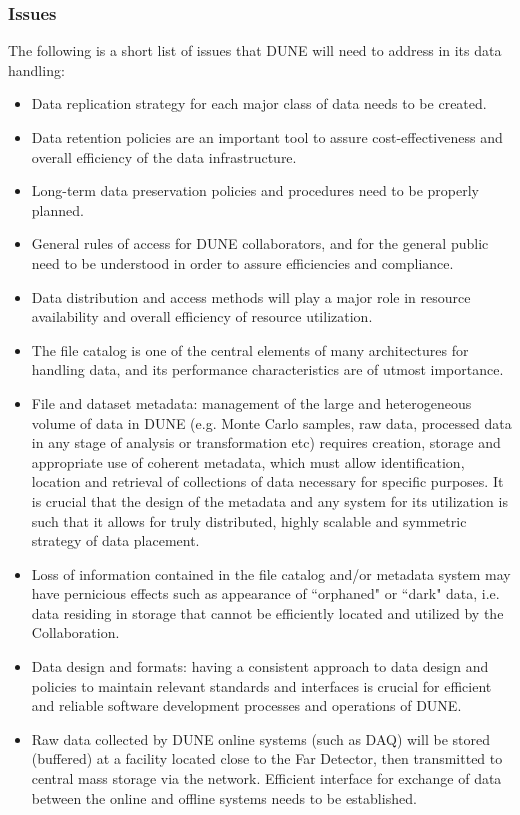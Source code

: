 \subsubsection{Issues}
The following is a short list of issues that DUNE will need to address in its data handling:
\begin{itemize}
\item Data replication strategy for each major class of data needs to be created.

\item Data retention policies are an important tool to assure cost-effectiveness and overall efficiency of the  data infrastructure.

\item Long-term data preservation policies and procedures need to be properly planned.

\item General rules of access for DUNE collaborators, and for the general public need to be understood in order to assure efficiencies and compliance.

\item Data distribution and access methods will play a major role in resource availability and overall efficiency of resource utilization.

\item The file catalog is one of the central elements of many architectures for handling data, and its performance characteristics are of utmost importance.

\item File and dataset metadata: management of the large and heterogeneous volume of data in DUNE  (e.g. Monte Carlo samples, raw data, processed data in any stage of analysis or transformation etc) requires creation, storage and appropriate use of coherent metadata, which must allow identification, location and retrieval of collections of data necessary for specific purposes. It is crucial that the design of the metadata and any system for its utilization is such that it allows for truly distributed, highly scalable and symmetric strategy of data placement.

\item Loss of information contained in the file catalog and/or metadata system may have pernicious effects such as appearance of ``orphaned" or ``dark" data, i.e. data 
residing in storage that cannot be efficiently located and utilized by the Collaboration.

\item Data design and formats: having a consistent approach to data design and policies to maintain relevant standards and interfaces is crucial for efficient and reliable software development processes and operations of DUNE.

\item Raw data collected by DUNE  online systems (such as DAQ) will be stored (buffered) at a facility located close to the Far Detector, then transmitted to central mass storage via the network. Efficient interface for exchange of data between the online and offline systems needs to be established.

\end{itemize}

